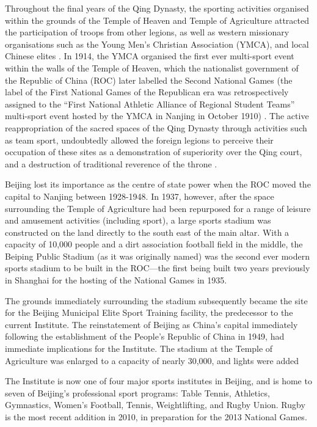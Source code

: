 Throughout the final years of the Qing Dynasty, the sporting activities organised within the grounds of the Temple of Heaven and Temple of Agriculture attracted the participation of troops from other legions, as well as western missionary organisations such as the Young Men’s Christian Association (YMCA), and local Chinese elites \citep{Steel1985}. In 1914, the YMCA organised the first ever multi-sport event within the walls of the Temple of Heaven, which the nationalist government of the Republic of China (ROC) later labelled the Second National Games (the label of the First National Games of the Republican era was retrospectively assigned to the ``First National Athletic Alliance of Regional Student Teams'' multi-sport event hosted by the YMCA in Nanjing in October 1910) \citep[441]{Li2015}. The active reappropriation of the sacred spaces of the Qing Dynasty through activities such as team sport, undoubtedly allowed the foreign legions to perceive their occupation of these sites as a demonstration of superiority over the Qing court, and a destruction of traditional reverence of the throne \citep{Hevia1990}.

Beijing lost its importance as the centre of state power when the ROC moved the capital to Nanjing between 1928-1948.  In 1937, however, after the space surrounding the Temple of Agriculture had been repurposed for a range of leisure and amusement activities (including sport), a large sports stadium was constructed on the land directly to the south east of the main altar.  With a capacity of 10,000 people and a dirt association football field in the middle, the Beiping Public Stadium (as it was originally named) was the second ever modern sports stadium to be built in the ROC---the first being built two years previously in Shanghai for the hosting of the National Games in 1935.


The grounds immediately surrounding the stadium subsequently became the site for the Beijing Municipal Elite Sport Training facility, the predecessor to the current Institute.
The reinstatement of Beijing as China's capital immediately following the establishment of the People's Republic of China in 1949, had immediate implications for the Institute.  The stadium at the Temple of Agriculture was enlarged to a capacity of nearly 30,000, and lights were added



 The Institute is now one of four major sports institutes in Beijing, and is home to seven of Beijing's professional sport programs: Table Tennis, Athletics, Gymnastics, Women's Football, Tennis, Weightlifting, and Rugby Union.  Rugby is the most recent addition in 2010, in preparation for the 2013 National Games.





